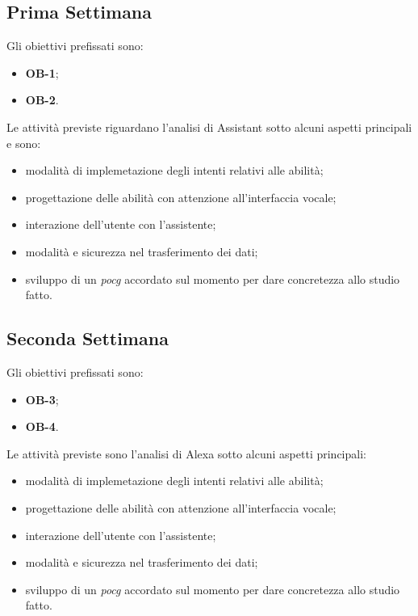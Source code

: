 	\subsection*{Prima Settimana}
	Gli obiettivi prefissati sono:
	\begin{itemize}
		\item \textbf{OB-1};
		\item \textbf{OB-2}.
	\end{itemize}
	Le attività previste riguardano l'analisi di Assistant sotto alcuni aspetti principali e sono:
	\begin{itemize}
		\item modalità di implemetazione degli intenti relativi alle abilità;
		\item progettazione delle abilità con attenzione all'interfaccia vocale;
		\item interazione dell'utente con l'assistente;
		\item modalità e sicurezza nel trasferimento dei dati;
		\item sviluppo di un \emph{\gls{pocg}} accordato sul momento per dare concretezza allo studio fatto.
	\end{itemize}
	\subsection*{Seconda Settimana}
	Gli obiettivi prefissati sono:
	\begin{itemize}
		\item \textbf{OB-3};
		\item \textbf{OB-4}.
	\end{itemize}
	Le attività previste sono l'analisi di Alexa sotto alcuni aspetti principali:
	\begin{itemize}
		\item modalità di implemetazione degli intenti relativi alle abilità;
		\item progettazione delle abilità con attenzione all'interfaccia vocale;
		\item interazione dell'utente con l'assistente;
		\item modalità e sicurezza nel trasferimento dei dati;
		\item sviluppo di un \emph{\gls{pocg}} accordato sul momento per dare concretezza allo studio fatto.
	\end{itemize}
